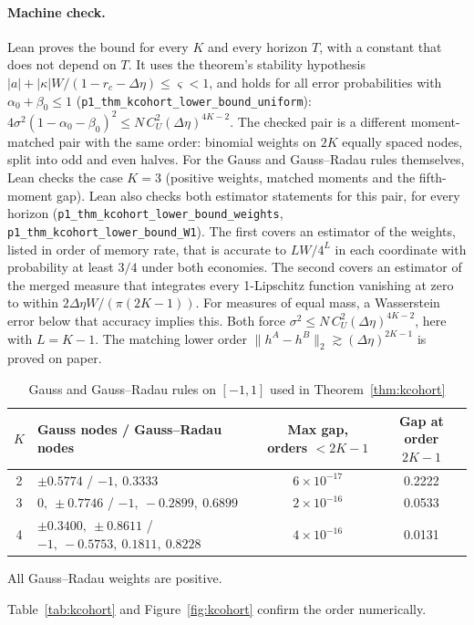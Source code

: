 \paragraph{Machine check.} Lean proves the bound for every $K$ and every horizon $T$, with a constant that does not depend on $T$. It uses the theorem's stability hypothesis $|a|+|\kappa|W/(1-r_c-\Delta\eta)\le\varsigma<1$, and holds for all error probabilities with $\alpha_0+\beta_0\le1$ (\nolinkurl{p1_thm_kcohort_lower_bound_uniform}): $4\sigma^2(1-\alpha_0-\beta_0)^2\le N\,C_U^2(\Delta\eta)^{4K-2}$. The checked pair is a different moment-matched pair with the same order: binomial weights on $2K$ equally spaced nodes, split into odd and even halves. For the Gauss and Gauss--Radau rules themselves, Lean checks the case $K=3$ (positive weights, matched moments and the fifth-moment gap). Lean also checks both estimator statements for this pair, for every horizon (\nolinkurl{p1_thm_kcohort_lower_bound_weights}, \nolinkurl{p1_thm_kcohort_lower_bound_W1}). The first covers an estimator of the weights, listed in order of memory rate, that is accurate to $LW/4^L$ in each coordinate with probability at least $3/4$ under both economies. The second covers an estimator of the merged measure that integrates every 1-Lipschitz function vanishing at zero to within $2\Delta\eta W/(\pi(2K-1))$. For measures of equal mass, a Wasserstein error below that accuracy implies this. Both force $\sigma^2\le N\,C_U^2(\Delta\eta)^{4K-2}$, here with $L=K-1$. The matching lower order $\|h^A-h^B\|_2\gtrsim(\Delta\eta)^{2K-1}$ is proved on paper.

\begin{table}[t]\centering\small
\begin{threeparttable}
\caption{Gauss and Gauss--Radau rules on $[-1,1]$ used in Theorem~\ref{thm:kcohort}}\label{tab:radau}
\begin{tabular}{cp{}cc}
\toprule
$K$ & Gauss nodes / Gauss--Radau nodes & Max gap, orders $<2K-1$ & Gap at order $2K-1$\\
\midrule
2 & $\pm0.5774$ \;/\; $-1,\ 0.3333$ & $6\times10^{-17}$ & 0.2222\\
3 & $0,\ \pm0.7746$ \;/\; $-1,\ -0.2899,\ 0.6899$ & $2\times10^{-16}$ & 0.0533\\
4 & $\pm0.3400,\ \pm0.8611$ \;/\; $-1,\ -0.5753,\ 0.1811,\ 0.8228$ & $4\times10^{-16}$ & 0.0131\\
\bottomrule
\end{tabular}
\begin{tablenotes}\footnotesize\item All Gauss--Radau weights are positive. \end{tablenotes}
\end{threeparttable}
\end{table} Table~\ref{tab:kcohort} and Figure~\ref{fig:kcohort} confirm the order numerically.

